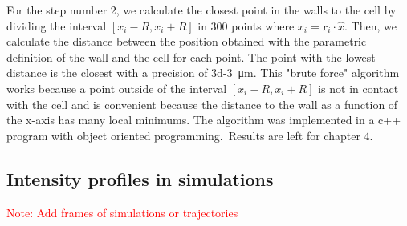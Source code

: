 For the step number 2, we calculate the closest point in the walls to the cell by dividing the interval $[x_i-R, x_i +R]$ in 300 points where $x_i = \textbf{r}_i \cdot \hat{x}$. Then, we calculate the distance between the position obtained with the parametric definition of the wall and the cell for each point. The point with the lowest distance is the closest with a precision of \SI{3d-3}{\micro\meter}. This "brute force" algorithm works because a point outside of the interval $[x_i-R, x_i +R]$ is not in contact with the cell and is convenient because the distance to the wall as a function of the x-axis has many local minimums. The algorithm was implemented in a c++ program with object oriented programming.\ Results are left for chapter 4.

\subsection{Intensity profiles in simulations}

\textcolor{red}{Note: Add frames of simulations or trajectories}